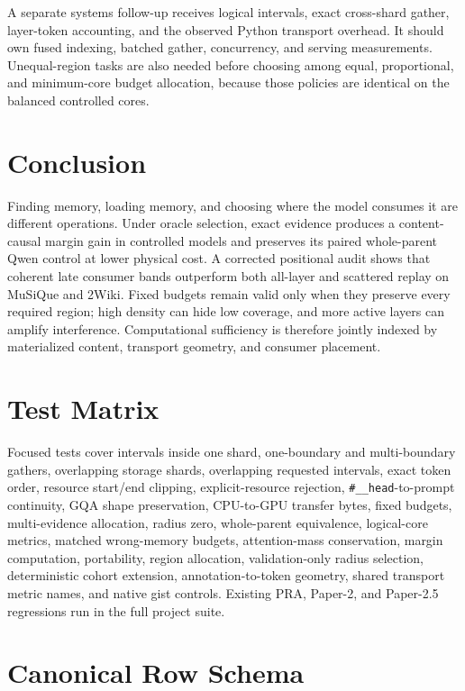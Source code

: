 \documentclass[11pt]{article}
\begin{document}
A separate systems follow-up receives logical intervals, exact cross-shard gather, layer-token
accounting, and the observed Python transport overhead.  It should own fused indexing, batched
gather, concurrency, and serving measurements.  Unequal-region tasks are also needed before
choosing among equal, proportional, and minimum-core budget allocation, because those policies are
identical on the balanced controlled cores.

\section{Conclusion}

Finding memory, loading memory, and choosing where the model consumes it are different operations.
Under oracle selection, exact evidence produces a content-causal margin gain in controlled models
and preserves its paired whole-parent Qwen control at lower physical cost.  A corrected positional
audit shows that coherent late consumer bands outperform both all-layer and scattered replay on
MuSiQue and 2Wiki.  Fixed budgets remain valid only when they preserve every required region; high
density can hide low coverage, and more active layers can amplify interference.  Computational
sufficiency is therefore jointly indexed by materialized content, transport geometry, and consumer
placement.

\appendix

\section{Test Matrix}

Focused tests cover intervals inside one shard, one-boundary and multi-boundary gathers, overlapping
storage shards, overlapping requested intervals, exact token order, resource start/end clipping,
explicit-resource rejection, \texttt{\#\_\_head}-to-prompt continuity, GQA shape preservation,
CPU-to-GPU transfer bytes, fixed budgets, multi-evidence allocation, radius zero, whole-parent
equivalence, logical-core metrics, matched wrong-memory budgets, attention-mass conservation,
margin computation, portability, region allocation, validation-only radius selection, deterministic
cohort extension, annotation-to-token geometry, shared transport metric names, and native gist
controls.  Existing PRA, Paper-2, and Paper-2.5 regressions run in the full project suite.

\section{Canonical Row Schema}
\end{document}
